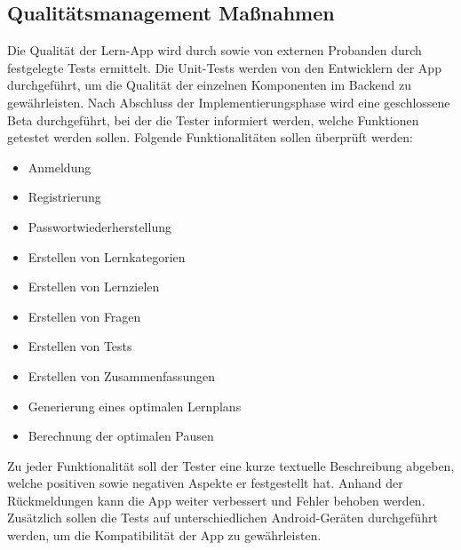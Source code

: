 \newpage
\subsection{Qualitätsmanagement Maßnahmen}
Die Qualität der Lern-App wird durch  sowie von externen Probanden durch festgelegte Tests ermittelt. Die Unit-Tests werden von den Entwicklern der App durchgeführt, um die Qualität der einzelnen Komponenten im Backend zu gewährleisten. Nach Abschluss der Implementierungsphase wird eine geschlossene Beta durchgeführt, bei der die Tester informiert werden, welche Funktionen getestet werden sollen. Folgende Funktionalitäten sollen überprüft werden:
\begin{itemize}
  \item Anmeldung
  \item Registrierung
  \item Passwortwiederherstellung
  \item Erstellen von Lernkategorien
  \item Erstellen von Lernzielen
  \item Erstellen von Fragen
  \item Erstellen von Tests
  \item Erstellen von Zusammenfassungen
  \item Generierung eines optimalen Lernplans
  \item Berechnung der optimalen Pausen
\end{itemize}
\noindent
Zu jeder Funktionalität soll der Tester eine kurze textuelle Beschreibung abgeben, welche positiven sowie negativen Aspekte er festgestellt hat. Anhand der Rückmeldungen kann die App weiter verbessert und Fehler behoben werden.
Zusätzlich sollen die Tests auf unterschiedlichen Android-Geräten durchgeführt werden, um die Kompatibilität der App zu gewährleisten. 
